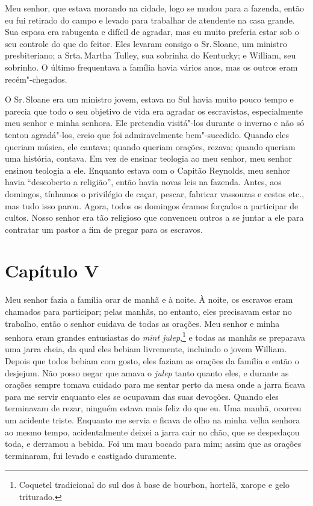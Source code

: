 Meu senhor, que estava morando na cidade, logo se mudou para a fazenda,
então eu fui retirado do campo e levado para trabalhar de atendente na
casa grande. Sua esposa era rabugenta e difícil de agradar, mas eu muito
preferia estar sob o seu controle do que do feitor. Eles levaram consigo
o Sr.\,Sloane, um ministro presbiteriano; a Srta.\,Martha Tulley, sua
sobrinha do Kentucky; e William, seu sobrinho. O último frequentava a
família havia vários anos, mas os outros eram recém"-chegados.

O Sr.\,Sloane era um ministro jovem, estava no Sul havia muito pouco
tempo e parecia que todo o seu objetivo de vida era agradar os
escravistas, especialmente meu senhor e minha senhora. Ele pretendia
visitá"-los durante o inverno e não só tentou agradá"-los, creio que foi
admiravelmente bem"-sucedido. Quando eles queriam música, ele cantava;
quando queriam orações, rezava; quando queriam uma história, contava. Em
vez de ensinar teologia ao meu senhor, meu senhor ensinou teologia a
ele. Enquanto estava com o Capitão Reynolds, meu senhor havia
``descoberto a religião'', então havia novas leis na fazenda. Antes, aos
domingos, tínhamos o privilégio de caçar, pescar, fabricar vassouras e
cestos etc., mas tudo isso parou. Agora, todos os domingos éramos
forçados a participar de cultos. Nosso senhor era tão religioso que
convenceu outros a se juntar a ele para contratar um pastor a fim de
pregar para os escravos.

\chapter*{Capítulo V}

Meu senhor fazia a família orar de manhã e à noite. À noite, os escravos
eram chamados para participar; pelas manhãs, no entanto, eles precisavam
estar no trabalho, então o senhor cuidava de todas as orações. Meu
senhor e minha senhora eram grandes entusiastas do \emph{mint
julep},\footnote{Coquetel tradicional do sul dos  à base de bourbon,
  hortelã, xarope e gelo triturado.} e todas as manhãs se preparava uma
jarra cheia, da qual eles bebiam livremente, incluindo o jovem William.
Depois que todos bebiam com gosto, eles faziam as orações da família e
então o desjejum. Não posso negar que amava o \emph{julep} tanto quanto
eles, e durante as orações sempre tomava cuidado para me sentar perto da
mesa onde a jarra ficava para me servir enquanto eles se ocupavam das
suas devoções. Quando eles terminavam de rezar, ninguém estava mais
feliz do que eu. Uma manhã, ocorreu um acidente triste. Enquanto me
servia e ficava de olho na minha velha senhora ao mesmo tempo,
acidentalmente deixei a jarra cair no chão, que se despedaçou toda, e
derramou a bebida. Foi um mau bocado para mim; assim que as orações
terminaram, fui levado e castigado duramente.

